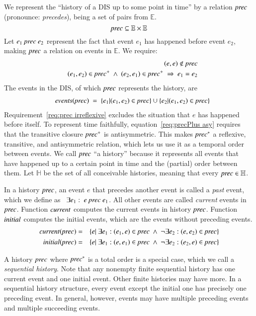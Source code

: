 \documentclass{elsarticle}
\def\id#1{\text{\it #1\/}}
\begin{document}
	We represent the ``history of a DIS up to some point in time'' by a relation $\id{prec}$ (pronounce: {\em precedes}),
	being a set of pairs from $\mathbb E$.
\[\id{prec}\subseteq\mathbb E\times\mathbb E\]
	Let $e_1\ \id{prec}\ e_2$ represent the fact that event $e_1$ has happened before event $e_2$,
	making $\id{prec}$ a relation on events in $\mathbb E$.
	We require:
\begin{eqnarray}
	&&(e,e)\notin\id{prec}\label{req:prec irreflexive}\\
	&&(e_1,e_2)\in\id{prec}^+\ \wedge\ (e_2,e_1)\in\id{prec}^+\ \Rightarrow\ e_1=e_2\label{req:precPlus asy}
\end{eqnarray}
	The events in the DIS, of which $\id{prec}$ represents the history, are 
\begin{eqnarray}
	&&\id{events}(\id{prec})\ =\ \{e_1|(e_1,e_2)\in\id{prec}\}\cup\{e_2|(e_1,e_2)\in\id{prec}\}\label{req:events}
\end{eqnarray}
	Requirement~\ref{req:prec irreflexive} excludes the situation that $e$ has happened before itself.
	To represent time faithfully, equation~\ref{req:precPlus asy} requires that the transitive closure $\id{prec}^+$ is antisymmetric.
	This makes $\id{prec}^*$ a reflexive, transitive, and antisymmetric relation, which lets us use it as a temporal order between events.
	We call $\id{prec}$ ``a history'' because it represents all events that have happened up to a certain point in time and the (partial) order between them.
	Let $\mathbb H$ be the set of all conceivable histories, meaning that every $\id{prec}\in\mathbb H$.

	In a history $\id{prec}$, an event $e$ that precedes another event is called a {\em past} event,
	which we define as \ $\exists e_1:\ e\ \id{prec}\ e_1$.
	All other events are called {\em current} events in $\id{prec}$.
	Function $\id{current}$ computes the current events in history $\id{prec}$.
	Function $\id{initial}$ computes the initial events, which are the events without preceding events.
\begin{eqnarray}
	\id{current}(\id{prec})&=&\{e |\ \exists e_1: (e_1,e)\in\id{prec}\ \wedge\ \neg\exists e_2: (e,e_2)\in\id{prec}\}\\
	\id{initial}(\id{prec})&=&\{e |\ \exists e_1: (e,e_1)\in\id{prec}\ \wedge\ \neg\exists e_2: (e_2,e)\in\id{prec}\}
\end{eqnarray}

	A history $\id{prec}$ where $\id{prec}^*$ is a total order is a special case, which we call a {\em sequential history}.
	Note that any nonempty finite sequential history has one current event and one initial event.
	Other finite histories may have more.
	In a sequential history structure, every event except the initial one has precisely one preceding event.
	In general, however, events may have multiple preceding events and multiple succeeding events.
\end{document}
